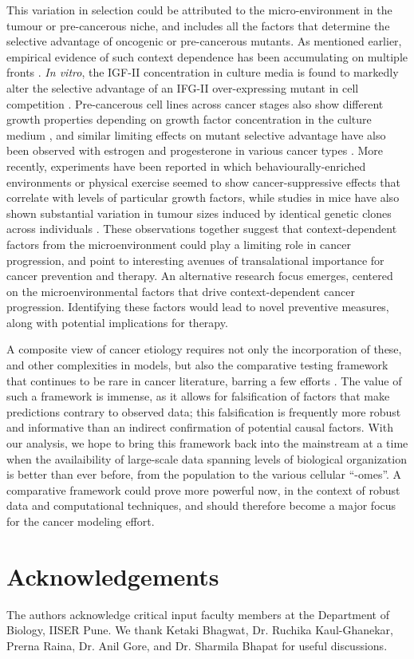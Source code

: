\documentclass[12pt,onecolumn,twoside]{article}
\begin{document}
This variation in selection could be attributed to the micro-environment in the tumour or pre-cancerous niche, and includes all the factors that determine the selective advantage of oncogenic or pre-cancerous mutants. As mentioned earlier, empirical evidence of such context dependence has been accumulating on multiple fronts \autocite{Hansen2000,Pietras2010,Hanahan2012,Cabarcas2011a}. \textit{In vitro}, the IGF-II concentration in culture media is found to markedly alter the selective advantage of an IFG-II over-expressing mutant in cell competition \autocite{Archetti2015}. Pre-cancerous cell lines across cancer stages also show different growth properties depending on growth factor concentration in the culture medium \autocite{Chan2014}, and similar limiting effects on mutant selective advantage have also been observed with estrogen and progesterone in various cancer types \autocite{Haslam2001,Woodward2000,DICKSON1987,Garcia1992}. More recently, experiments have been reported in which behaviourally-enriched environments or physical exercise seemed to show cancer-suppressive effects \autocite{Cao2010,Rundqvist2013} that correlate with levels of particular growth factors, while studies in mice have also shown substantial variation in tumour sizes induced by identical genetic clones across individuals \autocite{Rogers2017}. These observations together suggest that context-dependent factors from the microenvironment could play a limiting role in cancer progression, and point to interesting avenues of transalational importance for cancer prevention and therapy. An alternative research focus emerges, centered on the microenvironmental factors that drive context-dependent cancer progression. Identifying these factors would lead to novel preventive measures, along with potential implications for therapy.

A composite view of cancer etiology requires not only the incorporation of these, and other complexities in models, but also the comparative testing framework that continues to be rare in cancer literature, barring a few efforts \autocite{Frank2007}. The value of such a framework is immense, as it allows for falsification of factors that make predictions contrary to observed data; this falsification is frequently more robust and informative than an indirect confirmation of potential causal factors. With our analysis, we hope to bring this framework back into the mainstream at a time when the availaibility of large-scale data spanning levels of biological organization is better than ever before, from the population to the various cellular ``-omes''. A comparative framework could prove more powerful now, in the context of robust data and computational techniques, and should therefore become a major focus for the cancer modeling effort.

\section*{Acknowledgements}
The authors acknowledge critical input faculty members at the Department of Biology, IISER Pune. We thank Ketaki Bhagwat, Dr. Ruchika Kaul-Ghanekar, Prerna Raina, Dr. Anil Gore, and Dr. Sharmila Bhapat for useful discussions.

\printbibliography
\end{document}
